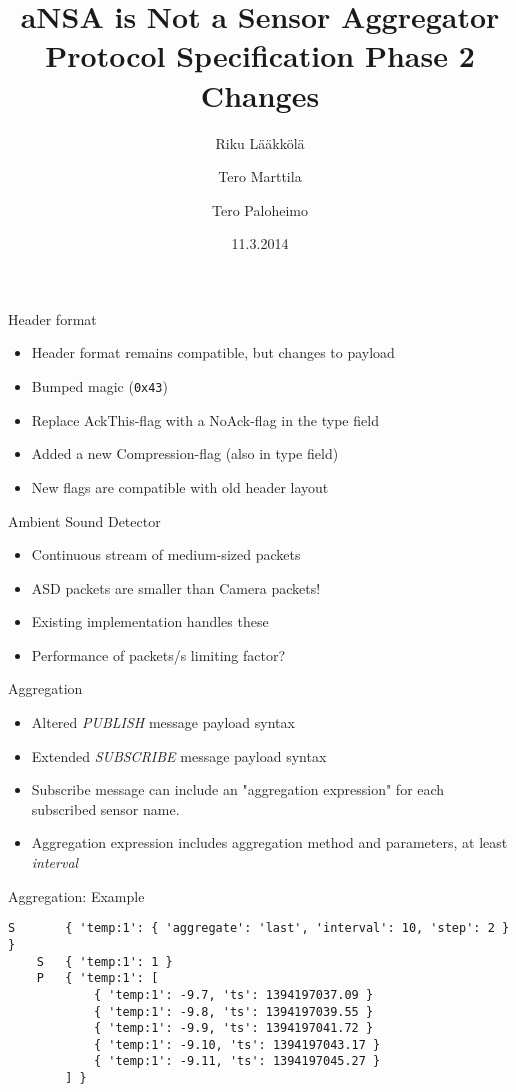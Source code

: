 \documentclass{beamer}
\title[SFO protocol]{aNSA is Not a Sensor Aggregator\\Protocol Specification Phase 2 Changes}
\author{Riku Lääkkölä \and Tero Marttila \and Tero Paloheimo}
\institute{Aalto ELEC}
\date{11.3.2014}
\begin{document}
\begin{frame}
\titlepage
\end{frame}

\begin{frame}{Header format}
\begin{itemize}
	\item Header format remains compatible, but changes to payload
	\item Bumped magic (\texttt{0x43})
	\item Replace AckThis-flag with a NoAck-flag in the type field
	\item Added a new Compression-flag (also in type field)
	\item New flags are compatible with old header layout
\end{itemize}
\end{frame}

\begin{frame}{Ambient Sound Detector}
\begin{itemize}
	\item Continuous stream of medium-sized packets
	\item ASD packets are smaller than Camera packets!
	\item Existing implementation handles these
	\item Performance of packets/s limiting factor?
\end{itemize}
\end{frame}

\begin{frame}{Aggregation}
\begin{itemize}
	\item Altered \emph{PUBLISH} message payload syntax
	\item Extended \emph{SUBSCRIBE} message payload syntax
	\item Subscribe message can include an "aggregation expression" for each subscribed sensor name.
	\item Aggregation expression includes aggregation method and parameters, at least \emph{interval}
\end{itemize}
\end{frame}

\begin{frame}[fragile]{Aggregation: Example}
\footnotesize
\begin{verbatim}
S       { 'temp:1': { 'aggregate': 'last', 'interval': 10, 'step': 2 } }
    S   { 'temp:1': 1 }
    P   { 'temp:1': [
            { 'temp:1': -9.7, 'ts': 1394197037.09 }
            { 'temp:1': -9.8, 'ts': 1394197039.55 }
            { 'temp:1': -9.9, 'ts': 1394197041.72 }
            { 'temp:1': -9.10, 'ts': 1394197043.17 }
            { 'temp:1': -9.11, 'ts': 1394197045.27 }
        ] }
\end{verbatim}
\end{frame}
\end{document}

